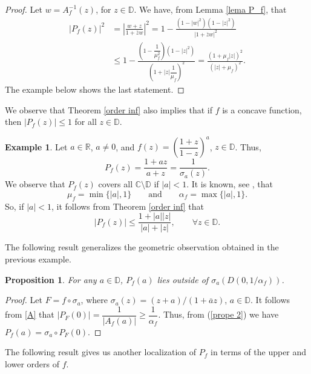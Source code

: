 \documentclass[reqno]{amsart}
\theoremstyle{plain}
\newtheorem{prop}[theo]{Proposition}
\theoremstyle{definition}
\newtheorem{example}[theo]{Example}
\newcommand{\C}{\mathbb{C}}
\newcommand{\D}{\mathbb{D}}
\newcommand{\R}{\mathbb{R}}
\begin{document}
\begin{proof}
  Let $w=A_f^{-1}(z)$, for $z\in \D$. We have, from Lemma \ref{lema P_f}, that
\begin{align*}
    |P_f(z)|^2&= \left|\frac{w+z}{1+\overline{z}w}\right|^2=1-\frac{(1-|w|^2)(1-|z|^2)}{|1+\overline{z}w|^2}\\
    &\leq  1-\frac{\left(1-\dfrac{1}{\mu_f^2}\right)(1-|z|^2)}{\left(1+|z|\dfrac{1}{\mu_f}\right)^2}=\frac{(1+\mu_f|z|)^2}{(|z|+\mu_f)^2}.
\end{align*}
The example below shows the last statement.
\end{proof} 
We observe that Theorem \ref{order inf} also implies that if $f$ is a concave function, then $|P_f(z)|\leq 1$ for all $z \in \D$.
\begin{example}
    Let $a\in \R$, $a\neq 0$, and $f(z)=\left(\dfrac{1+z}{1-z}\right)^a$, $z\in \D$. Thus, $$P_f(z)=\dfrac{1+az}{a+z}=\dfrac{1}{\sigma_a(z)}.$$ We observe that $P_f(z)$ covers all $\C\setminus \D$ if $|a|<1$. 
It is known, see \cite{Pomm2008}, that 
\[\mu_f = \min\{|a|, 1\}\qquad \text{and} \qquad  \alpha_f = \max\{|a|, 1\}.\]
So, if $|a|<1$, it follows from Theorem \ref{order inf} that $$|P_f(z)|\leq \frac{1+|a||z|}{|a|+|z|},\quad\quad \forall z\in \D.$$

\end{example}

The following result generalizes the geometric observation obtained in the previous example.
\begin{prop}
For any $a\in \D$, $P_f(a)$ lies outside of $\sigma_a(D(0,1/\alpha_f))$. 
\end{prop}
\begin{proof}
Let $F=f\circ \sigma_a$, where $\sigma_a(z)=(z+a)/(1+\overline{a}z)$, $a\in \mathbb{D}$. It follows from \eqref{A} that $|P_F(0)|=\dfrac{1}{|A_f(a)|}\geq \dfrac{1}{\alpha_f}.$ Thus, from (\ref{prope 2}) we have $P_f(a)=\sigma_a \circ P_F(0).$
\end{proof}

The following result gives us another localization of $P_f$ in terms of the upper and lower orders of $f$.
\end{document}
